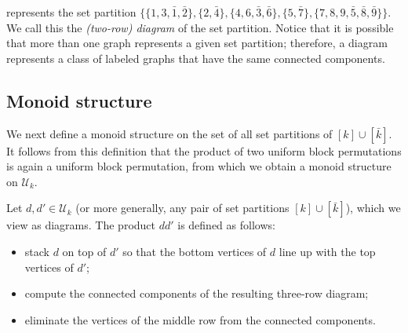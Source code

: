 \documentclass[10pt]{amsart}
\theoremstyle{definition}
\theoremstyle{remark}
\newcommand{\defncolor}{\color{darkred}}
\newcommand{\defn}[1]{{\defncolor\emph{#1}}} %
\begin{document}
represents the set partition $\{ \{1,3,\bar{1},\bar{2} \}, \{2,\bar{4} \}, \{4,6,\bar{3}, \bar{6}\}, \{5,\bar{7} \}, \{7, 8, 9, \bar{5}, \bar{8}, \bar{9} \}  \}$.
We call this the \defn{(two-row) diagram} of the set partition.
Notice that it is possible that more than one graph represents a given set
partition; therefore, a diagram represents a class of labeled graphs that have
the same connected components.

\subsection{Monoid structure}
\label{sec:monoidstructure}
We next define a monoid structure on the set of all set partitions of $[k] \cup
[\bar{k}]$. It follows from this definition that the product of two uniform
block permutations is again a uniform block permutation, from which we obtain
a monoid structure on $\mathcal{U}_k$.

Let $d, d' \in \mathcal{U}_k$ (or more generally, any pair of set partitions
$[k] \cup [\bar{k}]$), which we view as diagrams. The product $d d'$ is defined
as follows:
\begin{itemize}
    \item
        stack $d$ on top of $d'$ so that the bottom vertices of $d$
        line up with the top vertices of $d'$;

    \item
        compute the connected components of the resulting three-row diagram;

    \item
        eliminate the vertices of the middle row from the connected components.
\end{itemize}
\end{document}
